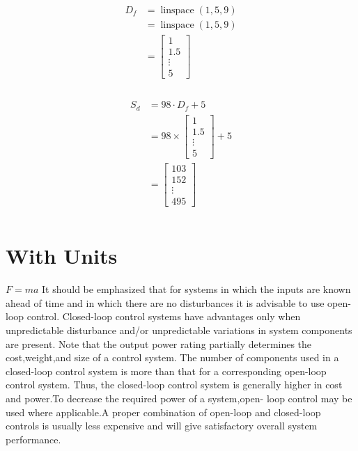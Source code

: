 \documentclass{report}
\begin{document}
\begin{align}
\begin{split}
D_{f}	&= \operatorname{linspace}{\left (1,5,9 \right )}\\
		&= \operatorname{linspace}{\left (1,5,9 \right )}\\
		&= \left[\begin{matrix}1\\1.5\\\vdots\\5\end{matrix}\right]\\
\end{split}
\end{align}

\begin{align}
\begin{split}
S_{d}	&= 98 \cdot D_{f} + 5\\
		&= 98 \times \left[\begin{matrix}1\\1.5\\\vdots\\5\end{matrix}\right] + 5\\
		&= \left[\begin{matrix}103\\152\\\vdots\\495\end{matrix}\right]\\
\end{split}
\end{align}

\section{With Units}
$F = ma$ It should be emphasized that for systems in which the inputs are known ahead of time and in which there are no disturbances it is advisable to use open-loop control.  Closed-loop control systems have advantages only when unpredictable disturbance  and/or unpredictable variations in system components are present. Note that the  output power rating partially determines the cost,weight,and size of a control system.  The number of components used in a closed-loop control system is more than that for  a corresponding open-loop control system. Thus, the closed-loop control system is generally higher in cost and power.To decrease the required power of a system,open-  loop control may be used where applicable.A proper combination of open-loop and  closed-loop controls is usually less expensive and will give satisfactory overall system  performance.
\end{document}
